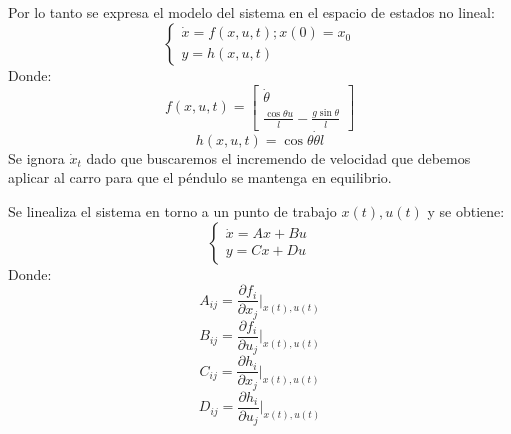 \documentclass{article}
\begin{document}
                Por lo tanto se expresa el modelo del sistema en el espacio de estados no lineal:
                \begin{equation}
                    \begin{cases}
                        \dot{x} = f(x,u,t) ; x(0) = x_0 \\
                        y = h(x,u,t)
                    \end{cases}
                \end{equation}
                Donde:
                \begin{equation}
                    f(x,u,t) = \begin{bmatrix}
                        \dot{\theta} \\
                        \frac{\cos{\theta} u}{l} - \frac{g \sin{\theta}}{l}
                    \end{bmatrix}
                \end{equation}
                \begin{equation}
                    h(x,u,t) = \cos{\theta} \dot{\theta} l
                \end{equation}
                Se ignora \(\dot{x}_t\) dado que buscaremos el incremendo de velocidad que debemos aplicar al carro para que el péndulo se mantenga en equilibrio.

                Se linealiza el sistema en torno a un punto de trabajo \(x(t), u(t)\) y se obtiene:
                \begin{equation}
                    \begin{cases}
                        \dot{x} = A x + B u \\
                        y = C x + D u
                    \end{cases}
                \end{equation}
                Donde:
                \begin{equation}
                    A_{ij}= \frac{\partial f_i}{\partial x_j} \Bigg|_{x(t), u(t)}
                \end{equation}
                \begin{equation}
                    B_{ij}= \frac{\partial f_i}{\partial u_j} \Bigg|_{x(t), u(t)}
                \end{equation}
                \begin{equation}
                    C_{ij}= \frac{\partial h_i}{\partial x_j} \Bigg|_{x(t), u(t)}
                \end{equation}
                \begin{equation}
                    D_{ij}= \frac{\partial h_i}{\partial u_j} \Bigg|_{x(t), u(t)}
                \end{equation}
\end{document}
